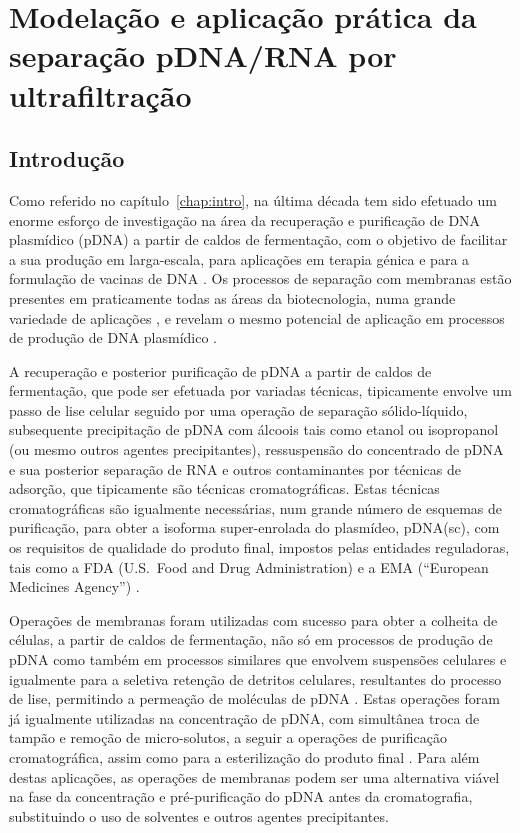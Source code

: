 \chapter{Modelação e aplicação prática da separação pDNA/RNA por ultrafiltração}
\label{chap:art4}

\section{Introdução}
\label{sec:art4_intro}
Como referido no capítulo~\ref{chap:intro}, na última década tem sido efetuado um enorme esforço de investigação na área da recuperação e purificação de DNA plasmídico (pDNA) a partir de caldos de fermentação, com o objetivo de facilitar a sua produção em larga-escala, para aplicações em terapia génica e para a formulação de vacinas de DNA \cite{prather,carnes,meu2}. Os processos de separação com membranas estão presentes em praticamente todas as áreas da biotecnologia, numa grande variedade de aplicações \cite{rathore,reis}, e revelam o mesmo potencial de aplicação em processos de produção de DNA plasmídico \cite{carnes,prather,flowsheets}.

A recuperação e posterior purificação de pDNA a partir de caldos de fermentação, que pode ser efetuada por variadas técnicas, tipicamente envolve um passo de lise celular seguido por uma operação de separação sólido-líquido, subsequente precipitação de pDNA com álcoois tais como etanol ou isopropanol (ou mesmo outros agentes precipitantes), ressuspensão do concentrado de pDNA e sua posterior separação de RNA e outros contaminantes por técnicas de adsorção, que tipicamente são técnicas cromatográficas.
%
Estas técnicas cromatográficas são igualmente necessárias, num grande número de esquemas de purificação, para obter a isoforma super-enrolada do plasmídeo, pDNA(sc), com os requisitos de qualidade do produto final, impostos pelas entidades reguladoras, tais como a FDA (U.S.\ Food and Drug Administration) e a EMA (``European Medicines Agency'') \cite{prather,carnes,sousabab}.
%
%
%

Operações de membranas foram utilizadas com sucesso para obter a colheita de células, a partir de caldos de fermentação, não só em processos de produção de pDNA como também em processos similares que envolvem suspensões celulares \cite{prather,riesmeier,morao01,brites} e igualmente para a seletiva retenção de detritos celulares, resultantes do processo de lise, permitindo a permeação de moléculas de pDNA \cite{duvaltff,meu3,freitas}. Estas operações foram já igualmente utilizadas na concentração de pDNA, com simultânea troca de tampão e remoção de micro-solutos, a seguir a operações de purificação cromatográfica, assim como para a esterilização do produto final \cite{prather,kong06,kong10}. Para além destas aplicações, as operações de membranas podem ser uma alternativa viável na fase da concentração e pré-purificação do pDNA antes da cromatografia, substituindo o uso de solventes e outros agentes precipitantes. 

